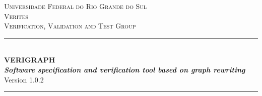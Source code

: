 \documentclass[12pt]{article}
\newcommand{\verigraphversion}{1.0.2}
\begin{document}
\begin{titlepage}

\newcommand{\HRule}{\rule{\linewidth}{0.5mm}} %

\center %
 

\textsc{\normalsize Universidade Federal do Rio Grande do Sul}\\[1.0cm] %
\textsc{\Large Verites}\\[0.2cm] %
\textsc{\large Verification, Validation and Test Group}\\[0.2cm] %


\HRule \\[0.4cm]
{ \huge \bfseries \LARGE{VERIGRAPH} \\ [1.0cm]
\emph{\large{Software specification and verification tool based on graph rewriting}}
}\\[0.5cm]

Version \verigraphversion \\[0.4cm] %
\HRule \\[1.0cm]
 




\end{titlepage}
\end{document}
